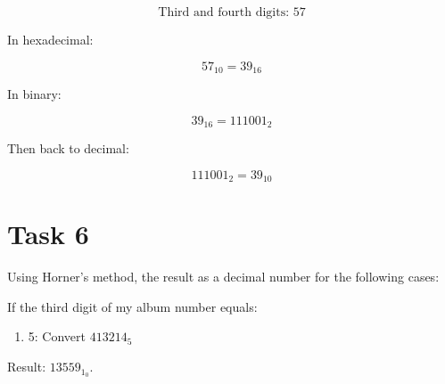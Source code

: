 \documentclass{article}
\begin{document}
\[
\text{Third and fourth digits: } 57
\]

In hexadecimal:

\[
57_{10} = 39_{16}
\]

In binary:

\[
39_{16} = 111001_2
\]

Then back to decimal:

\[
111001_2 = 39_{10}
\]

\section*{Task 6}
Using Horner's method, the result as a decimal number for the following cases:

If the third digit of my album number equals:

\begin{enumerate}
    \item 5: Convert \( 413214_5 \)
\end{enumerate}

Result: \( 13559_1_0 \).
\end{document}
